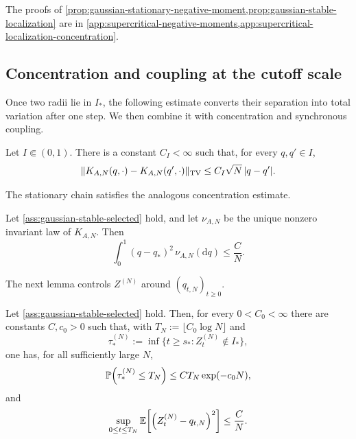 \documentclass[11pt,reqno,a4paper]{article}
\newcommand{\Pp}{\P}
\newcommand{\Ee}{\E}
\newcommand{\TV}{\mathrm{TV}}
\begin{document}
The proofs of
\cref{prop:gaussian-stationary-negative-moment,prop:gaussian-stable-localization}
are in \cref{app:supercritical-negative-moments,app:supercritical-localization-concentration}.

\subsection{Concentration and coupling at the cutoff scale}
\label{subsec:gaussian-dynamic-tracking-smoothing}

Once two radii lie in $I_\ast$, the following estimate converts their
separation into total variation after one step. We then combine it with
concentration and synchronous coupling.
\begin{lemma}
\label{lem:gaussian-score-smoothing}
  Let $I\Subset(0,1)$. There is a constant $C_I<\infty$ such that, for every
  $q,q'\in I$,
  \begin{equation}\label{eq:gaussian-score-tv-smoothing}
    \norm{K_{A,N}(q,\cdot)-K_{A,N}(q',\cdot)}_{\TV}
    \leq
    C_I\sqrt N\,\abs{q-q'} .
  \end{equation}
\end{lemma}

The stationary chain satisfies the analogous concentration estimate.
\begin{proposition}
\label{prop:gaussian-stationary-concentration}
  Let \cref{ass:gaussian-stable-selected} hold, and let $\nu_{A,N}$ be the unique
  nonzero invariant law of $K_{A,N}$. Then
  \begin{equation}\label{eq:gaussian-stationary-concentration}
    \int_0^1 (q-q_\ast)^2\,\nu_{A,N}(\mathrm{d}q)
    \leq
    \frac{C}{N}.
  \end{equation}
\end{proposition}

The next lemma controls $Z^{(N)}$ around $(q_{t,N})_{t\geq0}$.
\begin{lemma}
\label{lem:gaussian-orbit-concentration}
  Let \cref{ass:gaussian-stable-selected} hold. Then, for every
  $0<C_0<\infty$ there are
  constants $C,c_0>0$ such that, with
  $T_N:=\lfloor C_0\log N\rfloor$ and
  \begin{equation*}
    \tau_\ast^{(N)}
    :=
    \inf\{t\geq s_\ast:Z_t^{(N)}\notin I_\ast\},
  \end{equation*}
  one has, for all sufficiently large $N$,
  \begin{equation}\label{eq:gaussian-orbit-no-exit}
    \Pp\left(\tau_\ast^{(N)}\leq T_N\right)
    \leq
    C T_N\exp(-c_0N),
  \end{equation}
  and
  \begin{equation}\label{eq:gaussian-orbit-concentration}
    \sup_{0\leq t\leq T_N}
    \Ee\left[
      \left(Z_t^{(N)}-q_{t,N}\right)^2
    \right]
    \leq \frac{C}{N} .
  \end{equation}
\end{lemma}
\end{document}

